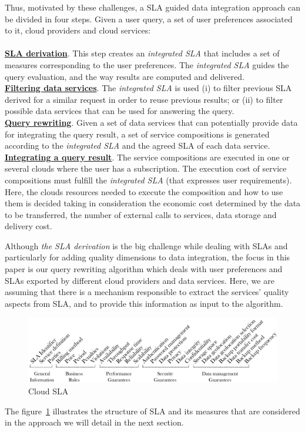 Thus, motivated by these challenges, a SLA guided data integration approach can be divided in four steps. Given a user query, a set of user preferences associated to it, cloud providers and cloud services:
\\ \\
\textbf{\underline{SLA derivation}}. This step creates an \textsl{integrated
SLA} that includes a set of measures corresponding to the user preferences. The \textsl{integrated SLA} guides the query evaluation, and the way results are computed and delivered. \\
\textbf{\underline{Filtering data services}}. The \textsl{integrated SLA} is used (i)
to filter previous SLA derived for a similar request in order to reuse previous results; or (ii) to filter possible data services that can be used for answering the query. \\
\textbf{\underline{Query rewriting}}. Given a set of data services that can
potentially provide data for integrating the query result, a set of service compositions is generated according to the \textsl{integrated SLA} and the agreed SLA of each data service. \\
\textbf{\underline{Integrating a query result}}. The service compositions are executed
in one or several clouds where the user has a subscription. The execution cost of service compositions must fulfill the \textsl{integrated SLA} (that expresses user requirements). Here, the clouds resources needed to execute the composition and how to use them is decided taking in consideration the economic cost determined by the data to be transferred, the number of external calls to services, data storage and delivery cost.
\bigskip

Although \textit{the SLA derivation} is the big challenge while dealing with
SLAs and particularly for adding quality dimensions to data integration, the
focus in this paper is our query rewriting algorithm which deals with user
preferences and SLAs exported by different cloud providers and data services.
Here, we are assuming that there is a mechanism responsible to extract the
services' quality aspects from SLA, and to provide this information as input to
the algorithm. 

\begin{figure}[h!]
\center
\includegraphics[scale=0.57]{Cloud_SLA.pdf}
\caption{Cloud SLA}\label{fig:cloudsla}
\end{figure}

The figure~\ref{fig:cloudsla} illustrates the structure of SLA
and its measures that are considered in the approach we will detail in the next
section.   